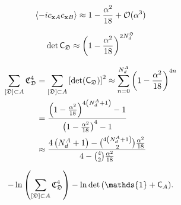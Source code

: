 \begin{equation}
    \langle -ic_{\mathbf{x}A}c_{\mathbf{x}B} \rangle 
    \approx
    1 - \frac{\alpha^2}{18} + \mathcal{O}(\alpha^3)
\end{equation}

\[
\det\mathsf{C}_{\mathfrak{D}}
\approx
\left( 1 - \frac{\alpha^2}{18} \right)^{2N_d^\mathfrak{D}}
\]

\begin{align*}
    \sum_{[\mathfrak{D}]\subset A} \mathfrak{C}_\mathfrak{D}^4
    &=
    \sum_{[\mathfrak{D}]\subset A} \left[ \det(\mathsf{C}_\mathfrak{D}) \right]^2
    \approx
    \sum_{n=0}^{N_d^A} 
    \left( 1 - \frac{\alpha^2}{18} \right)^{4n} \\
    &=
    \frac{\left( 1 - \frac{\alpha^2}{18} \right)^{4\left( N_d^A + 1 \right)} - 1}
    {\left( 1 - \frac{\alpha^2}{18} \right)^{4} - 1} \\
    &\approx
    \frac{
    4\left( N^A_d + 1 \right) - \binom{4\left( N^A_d + 1 \right)}{2}\frac{\alpha^2}{18}
    }{
    4 - \binom{4}{2}\frac{\alpha^2}{18}
    }
\end{align*}

\[
    -\ln\lr{
    \sum_{[\mathfrak{D}]\subset A} \mathfrak{C}_\mathfrak{D}^4
    }
    -
    \ln{
    \det\lr{
    \mathds{1} + \mathsf{C}_A
    }
    }
    .
\]

